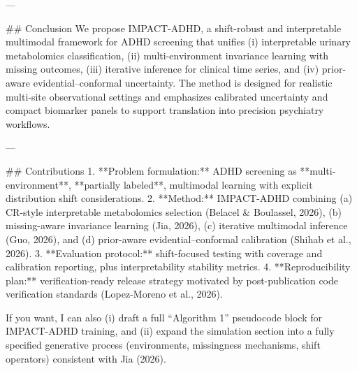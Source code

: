 ---

## Conclusion  
We propose IMPACT-ADHD, a shift-robust and interpretable multimodal framework for ADHD screening that unifies (i) interpretable urinary metabolomics classification, (ii) multi-environment invariance learning with missing outcomes, (iii) iterative inference for clinical time series, and (iv) prior-aware evidential–conformal uncertainty. The method is designed for realistic multi-site observational settings and emphasizes calibrated uncertainty and compact biomarker panels to support translation into precision psychiatry workflows.

---

## Contributions  
1. **Problem formulation:** ADHD screening as **multi-environment**, **partially labeled**, multimodal learning with explicit distribution shift considerations.  
2. **Method:** IMPACT-ADHD combining (a) CR-style interpretable metabolomics selection (Belacel & Boulassel, 2026), (b) missing-aware invariance learning (Jia, 2026), (c) iterative multimodal inference (Guo, 2026), and (d) prior-aware evidential–conformal calibration (Shihab et al., 2026).  
3. **Evaluation protocol:** shift-focused testing with coverage and calibration reporting, plus interpretability stability metrics.  
4. **Reproducibility plan:** verification-ready release strategy motivated by post-publication code verification standards (Lopez-Moreno et al., 2026).

If you want, I can also (i) draft a full “Algorithm 1” pseudocode block for IMPACT-ADHD training, and (ii) expand the simulation section into a fully specified generative process (environments, missingness mechanisms, shift operators) consistent with Jia (2026).